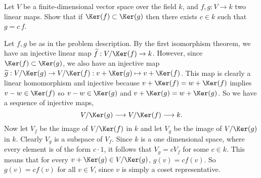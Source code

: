 \begin{problem}
Let $V$ be a finite-dimensional vector space over the field $k$, and $f,g:V\to k$ two linear maps. Show that if $\Ker(f)\subset \Ker(g)$ then there exists $c\in k$ such that $g=c\,f$.
\end{problem}

Let $f,g$ be as in the problem description. By the first isomorphism theorem, we have an injective linear map $\widetilde{f} : V/\Ker(f)\to k$. However, since $\Ker(f)\subset \Ker(g)$, we also have an injective map $\widetilde{g} : V/\Ker(g)\to V/\Ker(f) : v+\Ker(g) \mapsto v+\Ker(f)$. This map is clearly a linear homomorphism and injective because $v+\Ker(f)=w+\Ker(f)$ implies $v-w\in \Ker(f)$ so $v-w\in \Ker(g)$ and $v+\Ker(g)=w+\Ker(g)$. So we have a sequence of injective maps,
\[
  V/\Ker(g) \longrightarrow V/\Ker(f) \longrightarrow k
.\]
Now let $V_f$ be the image of $V/\Ker(f)$ in $k$ and let $V_g$ be the image of $V/\Ker(g)$ in $k$. Clearly $V_g$ is a subspace of $V_f$. Since $k$ is a one dimensional space, where every element is of the form $c\cdot 1$, it follows that $V_g=cV_f$ for some $c\in k$. This means that for every $v+\Ker(g)\in V/\Ker(g)$, $g(v)=cf(v)$. So $g(v)=cf(v)$ for all $v\in V$, since $v$ is simply a coset representative.     